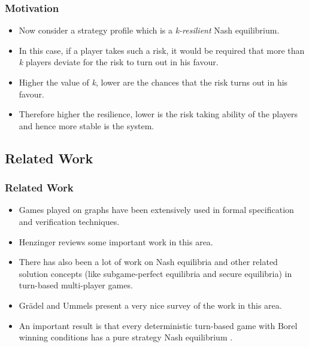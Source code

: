 \documentclass{beamer}
\begin{document}
\begin{frame}
\frametitle{Motivation}
  \begin{itemize}
 	\item Now consider a strategy profile which is a \textit{k-resilient} Nash equilibrium.
 	\item In this case, if a player takes such a risk, it would be required that more than \textit{k} players deviate for the risk to turn out in his favour.
 	\item Higher the value of \textit{k}, lower are the chances that the risk turns out in his favour.
 	\item Therefore higher the resilience, lower is the risk taking ability of the players and hence more stable is the system.
  \end{itemize}
\end{frame}

\subsection*{Related Work}
\begin{frame}
\frametitle{Related Work}
  \begin{itemize}
	\item Games played on graphs have been extensively used in formal specification and verification techniques.
 	\item Henzinger \cite{9} reviews some important work in this area.
 	\item There has also been a lot of work on Nash equilibria and other related solution concepts (like subgame-perfect equilibria and secure equilibria) in turn-based multi-player games.
 	\item Gr{\"a}del and Ummels \cite{Ummels-2008} present a very nice survey of the work in this area.
  	\item An important result is that every deterministic turn-based game with Borel winning conditions has a pure strategy Nash equilibrium \cite{6}.
  \end{itemize}
\end{frame}
\end{document}
